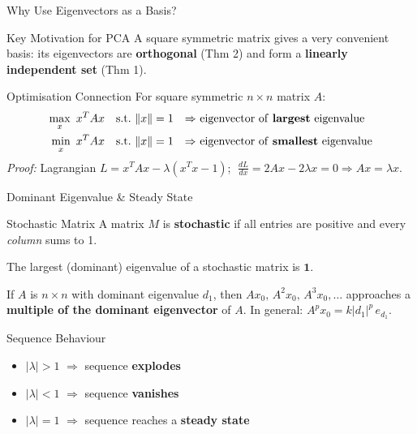 \documentclass{beamer}
\begin{document}
\begin{frame}[shrink=10]{Why Use Eigenvectors as a Basis?}
  \begin{block}{Key Motivation for PCA}
    A square symmetric matrix gives a very convenient basis:
    its eigenvectors are \textbf{orthogonal} (Thm 2) and form a
    \textbf{linearly independent set} (Thm 1).
  \end{block}

  \medskip

  \begin{block}{Optimisation Connection}
    For square symmetric $n\times n$ matrix $A$:
    \begin{align*}
      \max_x\ x^TAx \quad &\text{s.t.}\ \|x\|=1
      &\Rightarrow&\ \text{eigenvector of \textbf{largest} eigenvalue}\\
      \min_x\ x^TAx \quad &\text{s.t.}\ \|x\|=1
      &\Rightarrow&\ \text{eigenvector of \textbf{smallest} eigenvalue}
    \end{align*}
    \textit{Proof:} Lagrangian $L = x^TAx - \lambda(x^Tx-1)$;
    $\;\tfrac{dL}{dx} = 2Ax - 2\lambda x = 0
    \Rightarrow Ax = \lambda x$.
  \end{block}
\end{frame}

\begin{frame}[shrink=10]{Dominant Eigenvalue \& Steady State}
  \begin{block}{Stochastic Matrix}
    A matrix $M$ is \textbf{stochastic} if all entries are positive
    and every \emph{column} sums to 1.
  \end{block}

  \medskip

  \begin{theorem}
    The largest (dominant) eigenvalue of a stochastic matrix is
    $\mathbf{1}$.
  \end{theorem}

  \medskip

  \begin{theorem}
    If $A$ is $n\times n$ with dominant eigenvalue $d_1$, then
    $Ax_0,\,A^2x_0,\,A^3x_0,\ldots$ approaches a
    \textbf{multiple of the dominant eigenvector} of $A$.
    In general: $A^p x_0 = k|d_1|^p\,e_{d_1}$.
  \end{theorem}

  \medskip

  \begin{block}{Sequence Behaviour}
    \begin{itemize}\setlength\itemsep{5pt}
      \item $|\lambda|>1$ $\Rightarrow$ sequence \textbf{explodes}
      \item $|\lambda|<1$ $\Rightarrow$ sequence \textbf{vanishes}
      \item $|\lambda|=1$ $\Rightarrow$ sequence reaches a
            \textbf{steady state}
    \end{itemize}
  \end{block}
\end{frame}
\end{document}
